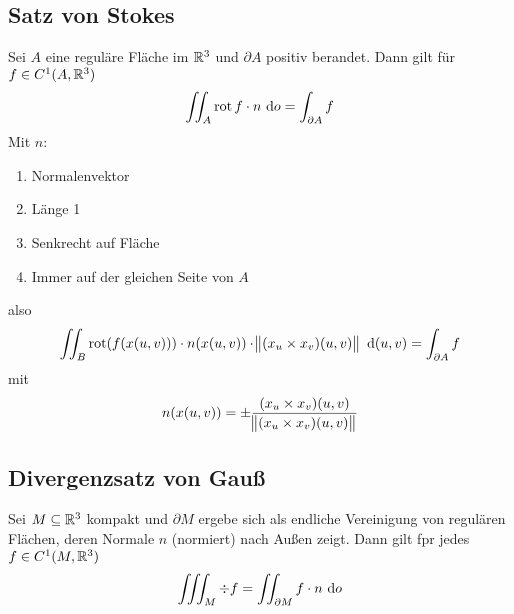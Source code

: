 \subsection{Satz von Stokes}
Sei $A$ eine reguläre Fläche im $\mathbb{R}^3$ und $\partial A$ positiv berandet. Dann
gilt für $f \in C^1(A, \mathbb{R}^3)$
\begin{equation*}
    \iint_A \operatorname{rot} f \cdot n \text{ d}o= \int_{\partial A} f
\end{equation*}
Mit $n$:
\begin{enumerate}[label = (\roman*)]
    \item Normalenvektor
    \item Länge 1
    \item Senkrecht auf Fläche
    \item Immer auf der gleichen Seite von $A$
\end{enumerate}
also
\begin{equation*}
    \iint_B \operatorname{rot}(f(x(u,v))) \cdot n(x(u,v)) \cdot \norm{(x_u \times x_v)(u,v)}
    \text{ d}(u,v) = \int_{\partial A} f
\end{equation*}
mit
\begin{equation*}
    n(x(u,v)) = \pm \frac{(x_u \times x_v)(u,v)}{\norm{(x_u \times x_v)(u,v)}}
\end{equation*}

\subsection{Divergenzsatz von Gauß}
Sei $M \subseteq \mathbb{R}^3$ kompakt und $\partial M$ ergebe sich als endliche
Vereinigung von regulären Flächen, deren Normale $n$ (normiert) nach Außen
zeigt. Dann gilt fpr jedes $f \in C^1(M, \mathbb{R}^3)$
\begin{equation*}
    \iiint_M \div f = \iint_{\partial M} f \cdot n \text{ d}o
\end{equation*}
